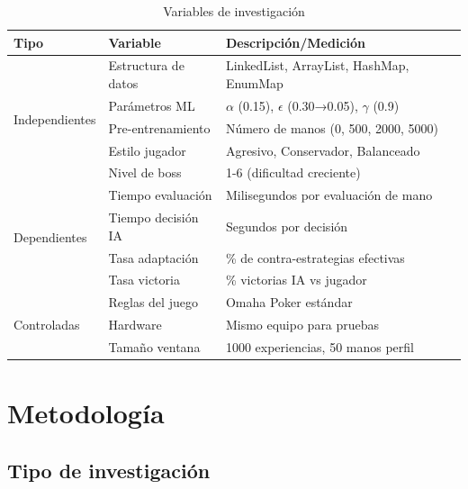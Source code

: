 \documentclass[12pt,a4paper]{article}
\begin{document}
\begin{table}[H]
\centering
\caption{Variables de investigación}
\begin{tabular}{|p{3cm}|p{4cm}|p{7cm}|}
\hline
\textbf{Tipo} & \textbf{Variable} & \textbf{Descripción/Medición} \\
\hline
\multirow{5}{*}{Independientes} 
& Estructura de datos & LinkedList, ArrayList, HashMap, EnumMap \\
\cline{2-3}
& Parámetros ML & $\alpha$ (0.15), $\epsilon$ (0.30→0.05), $\gamma$ (0.9) \\
\cline{2-3}
& Pre-entrenamiento & Número de manos (0, 500, 2000, 5000) \\
\cline{2-3}
& Estilo jugador & Agresivo, Conservador, Balanceado \\
\cline{2-3}
& Nivel de boss & 1-6 (dificultad creciente) \\
\hline
\multirow{4}{*}{Dependientes}
& Tiempo evaluación & Milisegundos por evaluación de mano \\
\cline{2-3}
& Tiempo decisión IA & Segundos por decisión \\
\cline{2-3}
& Tasa adaptación & \% de contra-estrategias efectivas \\
\cline{2-3}
& Tasa victoria & \% victorias IA vs jugador \\
\hline
\multirow{3}{*}{Controladas}
& Reglas del juego & Omaha Poker estándar \\
\cline{2-3}
& Hardware & Mismo equipo para pruebas \\
\cline{2-3}
& Tamaño ventana & 1000 experiencias, 50 manos perfil \\
\hline
\end{tabular}
\label{tab:variables}
\end{table}

\newpage



\section{Metodología}

\subsection{Tipo de investigación}
\end{document}
